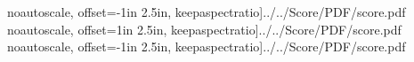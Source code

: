 \documentclass[12pt]{article}
\begin{document}
 noautoscale, offset=-1in 2.5in, keepaspectratio]{../../Score/PDF/score.pdf}
 noautoscale, offset=1in 2.5in, keepaspectratio]{../../Score/PDF/score.pdf}
 noautoscale, offset=-1in 2.5in, keepaspectratio]{../../Score/PDF/score.pdf}
\end{document}
